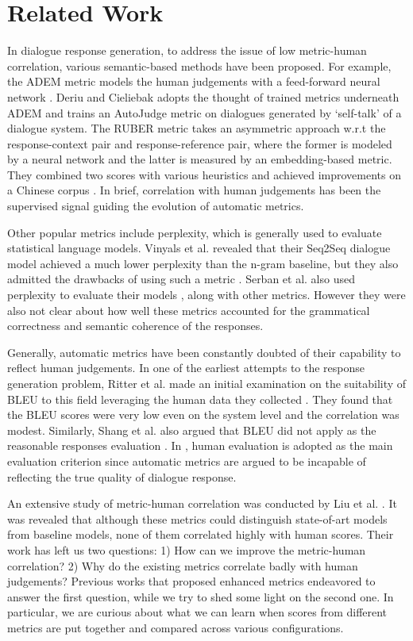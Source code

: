 \documentclass[conference]{IEEEtran}
\begin{document}
\section{Related Work}
In dialogue response generation, to address the issue of low metric-human correlation, various semantic-based methods have been proposed.
For example, the ADEM metric models the human judgements with a feed-forward neural network \cite{ADEM}.
Deriu and Cieliebak \cite{TowardsAMetric} adopts the thought of trained metrics underneath ADEM and trains an AutoJudge metric on dialogues generated by `self-talk' of a dialogue system.
The RUBER metric takes an asymmetric approach w.r.t the response-context pair and response-reference pair, where the former is modeled by a neural network and the latter is measured by an embedding-based metric.
They combined two scores with various heuristics and achieved improvements on a Chinese corpus \cite{RUBER}.
In brief, correlation with human judgements has been the supervised signal guiding the evolution of automatic metrics.

Other popular metrics include perplexity, which is generally used to evaluate statistical language models.
Vinyals et al. revealed that their Seq2Seq dialogue model achieved a much lower perplexity than the n-gram baseline, but they also admitted the drawbacks of using such a metric \cite{GoogleChatbot}.
Serban et al. also used perplexity to evaluate their models \cite{HRED}, along with other metrics.
However they were also not clear about how well these metrics accounted for the grammatical correctness and semantic coherence of the responses.

Generally, automatic metrics have been constantly doubted of their capability to reflect human judgements.
In one of the earliest attempts to the response generation problem,
Ritter et al. made an initial examination on the suitability of BLEU to this field leveraging the human data they collected \cite{Ritter11}.
They found that the BLEU scores were very low even on the system level and the correlation was modest.
Similarly, Shang et al. also argued that BLEU did not apply as the reasonable responses evaluation \cite{Shang}.
In \cite{RetrievalGuided}, human evaluation is adopted as the main evaluation criterion since automatic metrics are argued to be incapable of reflecting the true quality of dialogue response.

An extensive study of metric-human correlation was conducted by Liu et al. \cite{HowNot}.
It was revealed that although these metrics could distinguish state-of-art models from baseline models, none of them correlated highly with human scores.
Their work has left us two questions: 1) How can we improve the metric-human correlation? 2) Why do the existing metrics correlate badly with human judgements?
Previous works that proposed enhanced metrics endeavored to answer the first question, while we try to shed some light on the second one.
In particular, we are curious about what we can learn when scores from different metrics are put together and compared across various configurations.
\end{document}
